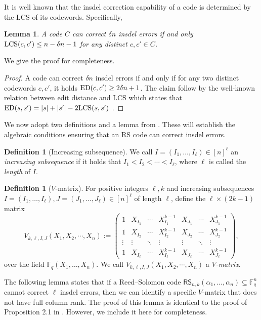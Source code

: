 \documentclass[11pt]{article}
\theoremstyle{plain}
\newtheorem{lemma}[thm]{Lemma}
\theoremstyle{definition}
\newtheorem{defn}[thm]{Definition}
\theoremstyle{remark}
\newcommand{\F}{\mathbb{F}}
\newcommand{\ed}[2]{\textup{ED}(#1, #2)}
\begin{document}
It is well known that the insdel correction capability of a code is determined by the LCS of its codewords. Specifically,
\begin{lemma} \label{lem:code-lcs}
    A code $C$ can correct $\delta n$ insdel errors if and only $\textup{LCS}(c,c')\leq n - \delta n - 1$ for any distinct $c,c'\in C$.
\end{lemma}
We give the proof for completeness.
\begin{proof}
    A code can correct $\delta n$ insdel errors if and only if
    for any two distinct codewords $c,c'$, it holds $\ed{c}{c'} \geq 2\delta n + 1$. 
    The claim follow by the well-known relation between edit distance and LCS which states that
    $\ed{s}{s'} = |s| + |s'| - 2 \textup{LCS}(s,s')$ \cite[Lemma 12.1]{crochemore2003jewels}.
\end{proof}

We now adopt two definitions and a lemma from \cite{con2023reed}. These will establish the algebraic conditions ensuring that an RS code can correct insdel errors.

\begin{defn}[Increasing subsequence]
    We call $I=(I_1,\dots,I_\ell)\in[n]^\ell$ an \emph{increasing subsequence} if it holds that $ I_1<I_2<\cdots<I_\ell$, where $\ell$ is called the \emph{length} of $I$.
\end{defn}

\begin{defn}[$V$-matrix]\label{matrix} 
For positive integers $\ell, k$ and increasing subsequences $I=(I_1,\dots,I_\ell),J=(J_1,\dots,J_\ell)\in [n]^{\ell}$ of length $\ell$, define the $\ell\times(2k-1)$ matrix
\[
V_{k,\ell,I,J}(X_1,X_2,\cdots,X_n):=\left(\begin{array}{ccccccc}1 & X_{I_1} & \cdots & X_{I_1}^{k-1} & X_{J_1} & \cdots & X_{J_1}^{k-1} \\1 & X_{I_2} & \cdots & X_{I_2}^{k-1} & X_{J_2} & \cdots & X_{J_2}^{k-1} \\ \vdots& \vdots & \ddots& \vdots & \vdots & \ddots & \vdots \\1 & X_{I_\ell} & \cdots & X_{I_\ell}^{k-1} & X_{J_\ell} & \cdots & X_{J_\ell}^{k-1}\end{array}\right),
\]
over the field 
$\F_q(X_1,\dots,X_n)$. We call $V_{k,\ell,I,J}(X_1,X_2,\cdots,X_n)$
a \emph{$V$-matrix}. 
\end{defn}


The following lemma states that if a Reed--Solomon code $\mathsf{RS}_{n,k}(\alpha_1, \ldots, \alpha_n)\subseteq\F_q^n$ cannot correct $\ell$ insdel errors, then we can identify a specific $V$-matrix that does not have full column rank. 
The proof of this lemma is identical to the proof of Proposition 2.1 in \cite{con2023reed}. However, we include it here for completeness.
\end{document}
